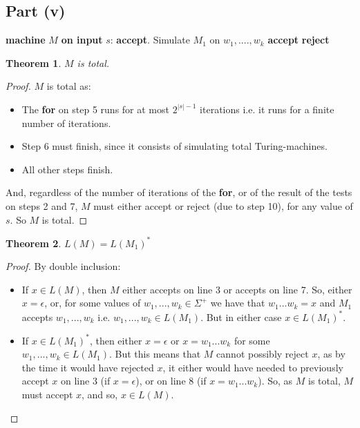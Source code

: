 \documentclass[a4paper,12pt]{scrartcl}
\newcommand{\Machine}[2]{\State \textbf{machine} #1 \textbf{on input} #2:}
\newcommand{\Reject}{\State \textbf{reject}}
\newcommand{\Accept}{\State \textbf{accept}}
\newtheorem{theorem}{Theorem}
\begin{document}
\subsection{Part (v)}
\begin{algorithmic}[1]
    \Machine{$M$}{$s$}
        \Accept.
    \EndIf
        \State Simulate $M_1$ on $w_1, ...., w_k$
            \Accept
        \EndIf
    \EndFor
    \Reject
\end{algorithmic}

\begin{theorem}
    $M$ is total.
\end{theorem}
\begin{proof}
    $M$ is total as:
    \begin{itemize}
        \item The \textbf{for} on step 5 runs for at most $2^{|s| - 1}$ iterations i.e. it runs for a finite number of iterations.
        \item Step 6 must finish, since it consists of simulating total Turing-machines.
        \item All other steps finish.
    \end{itemize}
    And, regardless of the number of iterations of the \textbf{for}, or of the result of the tests on steps 2 and 7, $M$ must either accept or reject (due to step 10), for any value of $s$. So $M$ is total.
\end{proof}
\begin{theorem}
    $L(M) = L(M_1)^*$
\end{theorem}
\begin{proof}
    By double inclusion:
    \begin{itemize}
        \item If $x \in L(M)$, then $M$ either accepts on line 3 or accepts on line 7. So, either $x = \epsilon$, or, for some values of $w_1, ..., w_k \in \Sigma^+$ we have that $w_1 ... w_k = x$ and $M_1$ accepts $w_1, ..., w_k$ i.e. $w_1, ..., w_k \in L(M_1)$. But in either case $x \in L(M_1)^*$.
        \item If $x \in L(M_1)^*$, then either $x = \epsilon$ or $x = w_1 ... w_k$ for some $w_1, ..., w_k \in L(M_1)$. But this means that $M$ cannot possibly reject $x$, as by the time it would have rejected $x$, it either would have needed to previously accept $x$ on line 3 (if $x = \epsilon$), or on line 8 (if $x = w_1 ... w_k$). So, as $M$ is total, $M$ must accept $x$, and so, $x \in L(M)$.
    \end{itemize}
\end{proof}
\end{document}
